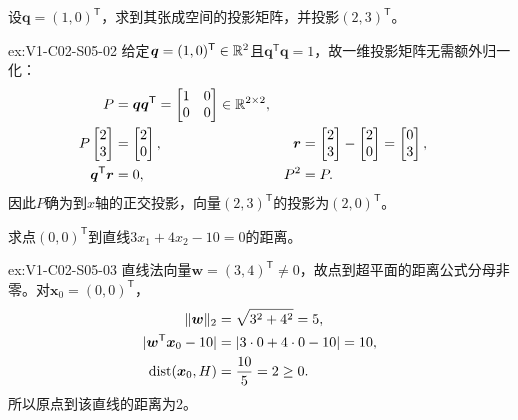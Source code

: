\begin{SLChapterExercisePairSection}
\begin{exercise}[投影矩阵]\label{ex:V1-C02-S05-02}
设$\boldsymbol{q}=(1,0)^{\mathsf T}$，求到其张成空间的投影矩阵，并投影$(2,3)^{\mathsf T}$。
\end{exercise}
\label{sol:V1-C02-S05-02}
\begin{chapterexercisesolution}{ex:V1-C02-S05-02}
给定$\boldsymbol q=(1,0)^{\mathsf T}\in\mathbb{R}^2$且$\boldsymbol q^{\mathsf T}\boldsymbol q=1$，故一维投影矩阵无需额外归一化：
\[
\begin{aligned}
P&=\boldsymbol q\boldsymbol q^{\mathsf T}
=\begin{bmatrix}1&0\\0&0\end{bmatrix}\in\mathbb{R}^{2\times2},\\
P\begin{bmatrix}2\\3\end{bmatrix}
&=\begin{bmatrix}2\\0\end{bmatrix},
&\boldsymbol r&=\begin{bmatrix}2\\3\end{bmatrix}
-\begin{bmatrix}2\\0\end{bmatrix}=\begin{bmatrix}0\\3\end{bmatrix},\\
\boldsymbol q^{\mathsf T}\boldsymbol r&=0,
&P^2&=P.
\end{aligned}
\]
因此$P$确为到$x$轴的正交投影，向量$(2,3)^{\mathsf T}$的投影为$(2,0)^{\mathsf T}$。
\end{chapterexercisesolution}

\begin{exercise}[点到直线距离]\label{ex:V1-C02-S05-03}
求点$(0,0)^{\mathsf T}$到直线$3x_1+4x_2-10=0$的距离。
\end{exercise}
\label{sol:V1-C02-S05-03}
\begin{chapterexercisesolution}{ex:V1-C02-S05-03}
直线法向量$\boldsymbol w=(3,4)^{\mathsf T}\ne0$，故点到超平面的距离公式分母非零。对$\boldsymbol x_0=(0,0)^{\mathsf T}$，
\[
\begin{aligned}
\lVert\boldsymbol w\rVert_2&=\sqrt{3^2+4^2}=5,\\
|\boldsymbol w^{\mathsf T}\boldsymbol x_0-10|
&=|3\cdot0+4\cdot0-10|=10,\\
\operatorname{dist}(\boldsymbol x_0,H)&=\frac{10}{5}=2\ge0.
\end{aligned}
\]
所以原点到该直线的距离为$2$。
\end{chapterexercisesolution}


\end{SLChapterExercisePairSection}
